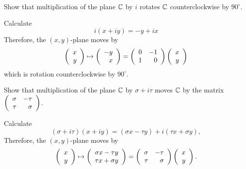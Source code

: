 \documentclass{ximera}
\begin{document}
\begin{exercise}\label{YZ_6.2_CplxMult1}
Show that multiplication of the plane $\C$ by $i$ rotates $\C$ counterclockwise by $90^\circ$. 

\begin{solution}
\soln
Calculate
\[
i (x+iy) = -y +ix
\]
Therefore, the $(x,y)$-plane moves by 
\[
 \Matrix{x\\y} \mapsto \Matrix{-y\\x} = \Matrix{ 0 & -1 \\ 1 & 0 } \Matrix{x\\y}
\]
which is rotation counterclockwise by $90^\circ$.
\end{solution}
\end{exercise}


\begin{exercise} \label{YZ_6.2_CplxMult1}
Show that multiplication of the plane $\C$ by $\sigma+i\tau$ moves $\C$ 
by the matrix $\Matrix{\sigma&-\tau\\ \tau&\sigma}$.

\begin{solution}
\soln
Calculate
\[
(\sigma+i\tau) (x+iy) = (\sigma x - \tau y)+i(\tau x + \sigma y),
\]
Therefore, the $(x,y)$-plane moves by
\[
 \Matrix{x\\y} \mapsto \Matrix{\sigma x - \tau y \\ \tau x + \sigma y} = 
 \Matrix{ \sigma & -\tau \\ \tau & \sigma } \Matrix{x\\y}.
\]
\end{solution}

\end{exercise}
\end{document}
